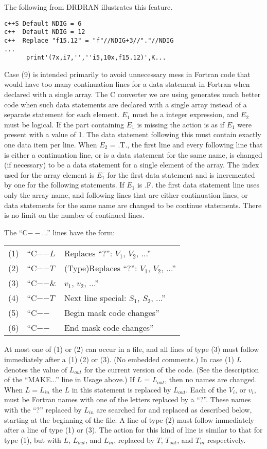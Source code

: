 \documentclass[twoside]{MATH77}
\begin{document}
The following from DRDRAN illustrates this feature.

\begin{verbatim}
c++S Default NDIG = 6
c++  Default NDIG = 12
c++  Replace "f15.12" = "f"//NDIG+3//"."//NDIG
...
      print'(7x,i7,'',''i5,10x,f15.12)',K...
\end{verbatim}

Case (9) is intended primarily to avoid unnecessary mess in Fortran code
that would have too many continuation lines for a data statement in
Fortran when declared with a single array.  The C converter we are using
generates much better code when such data statements are declared with a
single array instead of a separate statement for each element.  $E_1$ must
be a integer expression, and $E_2$ must be logical.  If the part
containing $E_1$ is missing the action is as if $E_1$ were present with a
value of 1.  The data statement following this must contain exactly one
data item per line.  When $E_2$ = .T., the first line and every following
line that is either a continuation line, or is a data statement for the
same name, is changed (if necessary) to be a data statement for a single
element of the array.  The index used for the array element is $E_1$ for
the first data statement and is incremented by one for the following
statements.  If $E_1$ is .F.  the first data statement line uses only the
array name, and following lines that are either continuation lines, or
data statements for the same name are changed to be continue statements.
There is no limit on the number of continued lines.

The ``C$--$...'' lines have the form:

\begin{tabular}{@{}lll}
(1) & ``C$-$$-$$L$ & Replaces ``?'': $V_1$, $V_2$, ...''\\
(2) & ``C$-$$-$$T$ & (Type)Replaces ``?'': $V_1$, $V_2$, ...''\\
(3) & ``C$-$$-$\& & $v_1$, $v_2$, ...''\\
(4) & ``C$-$$-T$ & Next line special: $S_1$, $S_2$, ...''\\
(5) & ``C$-$$-$ & Begin mask code changes''\\
(6) & ``C$-$$-$ & End mask code changes''\\
\end {tabular}

At most one of (1) or (2) can occur in a file, and all lines of type
(3) must follow immediately after a (1) (2) or (3).  (No embedded
comments.) In case (1) $L$ denotes the value of $L_{out}$ for the
current version of the code.  (See the description of the ``MAKE...''
line in Usage above.) If $L$ = $L_{out}$, then no names are changed.
When $L=L_{in}$ the $L$ in this statement is replaced by $L_{out}$.
Each of the $V_i$, or $v_i$, must be Fortran names with one of the
letters replaced by a ``?''.  These names with the ``?''  replaced by
$L_{in}$ are searched for and replaced as described below, starting
at the beginning of the file.  A line of type (2) must follow
immediately after a line of type (1) or (3).  The action for this
kind of line is similar to that for type (1),  but with $L$,
$L_{out}$, and $L_{in}$, replaced by $T$, $T_{out}$, and $T_{in}$
respectively.
\end{document}
